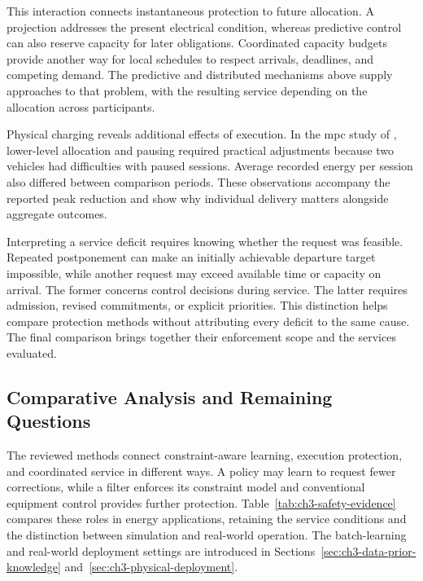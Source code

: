 This interaction connects instantaneous protection to future allocation. A projection addresses the present electrical condition, whereas predictive control can also reserve capacity for later obligations. Coordinated capacity budgets provide another way for local schedules to respect arrivals, deadlines, and competing demand. The predictive and distributed mechanisms above supply approaches to that problem, with the resulting service depending on the allocation across participants.

Physical charging reveals additional effects of execution. In the \gls{mpc} study of \textcite{hermans2024mpc}, lower-level allocation and pausing required practical adjustments because two vehicles had difficulties with paused sessions. Average recorded energy per session also differed between comparison periods. These observations accompany the reported peak reduction and show why individual delivery matters alongside aggregate outcomes.

Interpreting a service deficit requires knowing whether the request was feasible. Repeated postponement can make an initially achievable departure target impossible, while another request may exceed available time or capacity on arrival. The former concerns control decisions during service. The latter requires admission, revised commitments, or explicit priorities. This distinction helps compare protection methods without attributing every deficit to the same cause. The final comparison brings together their enforcement scope and the services evaluated.

\subsection{Comparative Analysis and Remaining Questions}
\label{sec:ch3-safety-gaps}
\label{sec:ch2-gap-rq3}

The reviewed methods connect constraint-aware learning, execution protection, and coordinated service in different ways. A policy may learn to request fewer corrections, while a filter enforces its constraint model and conventional equipment control provides further protection. Table~\ref{tab:ch3-safety-evidence} compares these roles in energy applications, retaining the service conditions and the distinction between simulation and real-world operation. The batch-learning and real-world deployment settings are introduced in Sections~\ref{sec:ch3-data-prior-knowledge} and~\ref{sec:ch3-physical-deployment}.


